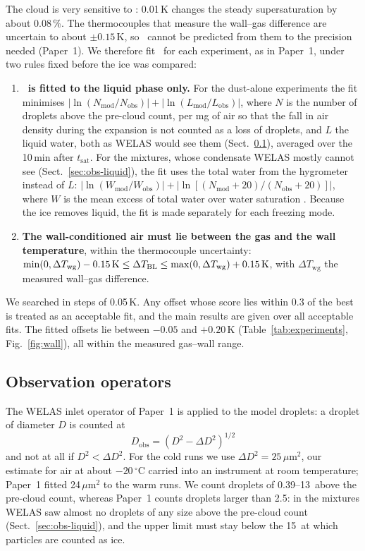 The cloud is very sensitive to \dTBL: 0.01\,K changes the steady supersaturation by about 0.08\,\%. The thermocouples that measure the wall--gas difference are uncertain to about $\pm0.15$\,K, so \dTBL\ cannot be predicted from them to the precision needed (Paper~1). We therefore fit \dTBL\ for each experiment, as in Paper~1, under two rules fixed before the ice was compared:
\begin{enumerate}
\item \textbf{\dTBL\ is fitted to the liquid phase only.} For the dust-alone experiments the fit minimises $|\ln(N_\mathrm{mod}/N_\mathrm{obs})| + |\ln(L_\mathrm{mod}/L_\mathrm{obs})|$, where $N$ is the number of droplets above the pre-cloud count, per mg of air so that the fall in air density during the expansion is not counted as a loss of droplets, and $L$ the liquid water, both as WELAS would see them (Sect.~\ref{sec:operators}), averaged over the 10\,min after $t_\mathrm{sat}$. For the mixtures, whose condensate WELAS mostly cannot see (Sect.~\ref{sec:obs-liquid}), the fit uses the total water from the hygrometer instead of $L$: $|\ln(W_\mathrm{mod}/W_\mathrm{obs})| + |\ln[(N_\mathrm{mod}+20)/(N_\mathrm{obs}+20)]|$, where $W$ is the mean excess of total water over water saturation \citep[saturation vapour pressures from][]{MurphyKoop2005}. Because the ice removes liquid, the fit is made separately for each freezing mode.
\item \textbf{The wall-conditioned air must lie between the gas and the wall temperature}, within the thermocouple uncertainty: $\min(0,\Delta T_\mathrm{wg}) - 0.15\,\mathrm{K} \le \Delta T_\mathrm{BL} \le \max(0,\Delta T_\mathrm{wg}) + 0.15\,\mathrm{K}$, with $\Delta T_\mathrm{wg}$ the measured wall--gas difference.
\end{enumerate}
We searched in steps of 0.05\,K. Any offset whose score lies within 0.3 of the best is treated as an acceptable fit, and the main results are given over all acceptable fits. The fitted offsets lie between $-0.05$ and $+0.20$\,K (Table~\ref{tab:experiments}, Fig.~\ref{fig:wall}), all within the measured gas--wall range. 

\subsection{Observation operators}\label{sec:operators}

The WELAS inlet operator of Paper~1 is applied to the model droplets: a droplet of diameter $D$ is counted at
\begin{equation}
  D_\mathrm{obs} = \left(D^2 - \Delta D^2\right)^{1/2}
  \label{eq:inlet}
\end{equation}
and not at all if $D^2 < \Delta D^2$. For the cold runs we use $\Delta D^2 = 25\,\mu$m$^2$, our estimate for air at about $-20\,^\circ$C carried into an instrument at room temperature; Paper~1 fitted 24\,$\mu$m$^2$ to the warm runs. We count droplets of 0.39--13\um\ above the pre-cloud count, whereas Paper~1 counts droplets larger than 2.5\um: in the mixtures WELAS saw almost no droplets of any size above the pre-cloud count (Sect.~\ref{sec:obs-liquid}), and the upper limit must stay below the 15\um\ at which particles are counted as ice.

